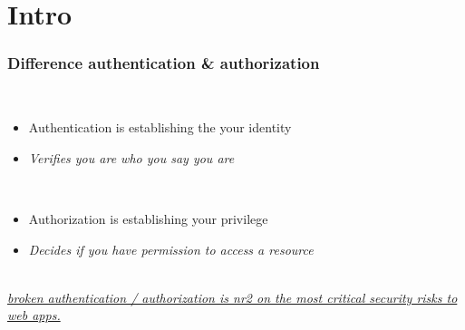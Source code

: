 \section{Intro}

\frame{\tableofcontents[currentsection]}

\begin{frame}
    \frametitle{Difference authentication \& authorization}

    \\
    \begin{itemize}
        \item Authentication is establishing the your identity
        \item \textit{Verifies you are who you say you are}
    \end{itemize}

    \vfill

    \\
    \begin{itemize}
        \item Authorization is establishing your privilege
        \item \textit{Decides if you have permission to access a resource}
    \end{itemize}

    \vfill

    \\
    \href{https://owasp.org/www-project-top-ten/}{\textit{broken authentication / authorization is nr2 on the most critical security risks to web apps.} }
\end{frame}